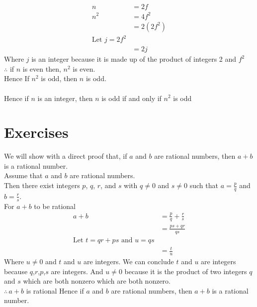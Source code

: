 \documentclass[12pt letter]{report}
\begin{document}
{\begin{myproof}
		\begin{align*}
			n   & = 2f                    \\
			n^2 & = 4f^2                  \\
			    & = 2 \left( 2f^2 \right) \\
			\text{Let }j = 2f^2           \\
			    & = 2j
		\end{align*}
		Where $j$ is an integer because it is made up of the product of integers 2 and $f^2$\\
		$\therefore$ if $n$ is even then, $n^2$ is even. \\
		Hence If $n^2$ is odd, then $n$ is odd. \\
		\\
		Hence if $n$ is an integer, then $n$ is odd if and only if $n^2$ is odd
	\end{myproof}
}



\section{Exercises}



\begin{myproof}
	We will show with a direct proof that, if $a$ and $b$ are rational numbers, then $a + b$ is a rational number. \\
	Assume that $a$ and $b$ are rational numbers. \\
	Then there exist integers $p$, $q$, $r$, and $s$ with $q \neq 0$ and $s \neq 0$ such that $a = \frac{p}{q}$ and $b =
		\frac{r}{s}$.\\
	For $a + b$ to be rational
	\begin{align*}
		a + b & = \frac{p}{q} + \frac{r}{s}  \\
		      & = \frac{ps + qr}{qs}         \\
		\text{Let $t =qr + ps$ and $u = qs$} \\
		      & = \frac{t}{u}
	\end{align*}
	Where $u \neq 0$ and $t$ and $u$ are integers. We can conclude $t$ and $u$ are integers because $q$,$r$,$p$,$s$ are
	integers. And $u\neq 0$ because it is the product of two integers $q$ and $s$ which are both nonzero which are both
	nonzero.\\
	$\therefore \, a + b$ is rational
	Hence if $a$ and $b$ are rational numbers, then $a + b$ is a rational number.
\end{myproof}
\end{document}
